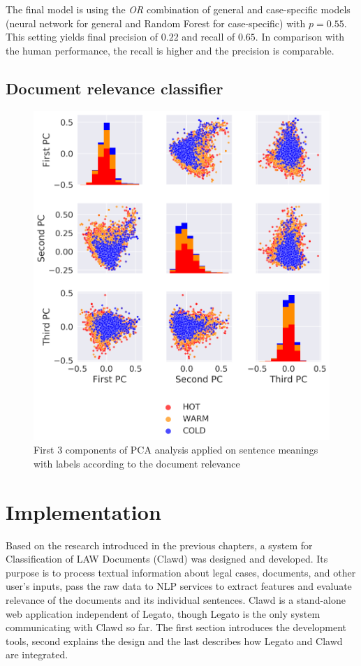 \documentclass[
  digital, %
  notable,   %
  nolof,     %
  nolot,     %
  draft
]{fithesis3}
\begin{document}
The final model is using the \textit{OR} combination of general and case-specific models (neural network for general and Random Forest for case-specific) with $p=0.55$.
This setting yields final precision of $0.22$ and recall of $0.65$.
In comparison with the human performance, the recall is higher and the precision is comparable.

\section{Document relevance classifier}
\label{sec:document-classifier}


\begin{figure}[H]
\caption{First 3 components of PCA analysis applied on sentence meanings with labels according to the document relevance}
\label{fig:PCA_sent_relevance}
\includegraphics[width=\textwidth]{img/PCA_doc_relevance}
\end{figure}

\chapter{Implementation}
Based on the research introduced in the previous chapters, a system for Classification of LAW Documents (Clawd) was designed and developed.
Its purpose is to process textual information about legal cases, documents, and other user's inputs, pass the raw data to NLP services to extract features and evaluate relevance of the documents and its individual sentences.
Clawd is a stand-alone web application independent of Legato, though Legato is the only system communicating with Clawd so far.
The first section introduces the development tools, second explains the design and the last describes how Legato and Clawd are integrated.
\end{document}
